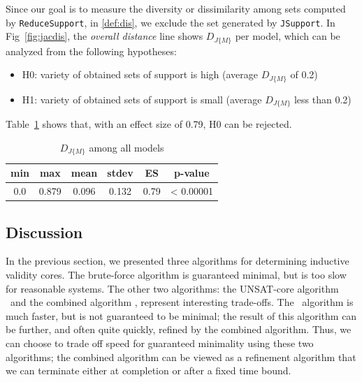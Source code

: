 Since our goal is to measure the diversity or dissimilarity among sets computed by \texttt{ReduceSupport}, in \ref{def:dis}, we exclude the set generated by \texttt{JSupport}. In Fig~\ref{fig:jacdis}, the \emph{overall distance} line shows $D_{J\{M\}}$ per model, which can be analyzed from the following hypotheses:
\begin{itemize}
  \item H0: variety of obtained sets of support is high (average $D_{J\{M\}}$ of 0.2)
  \item H1: variety of obtained sets of support is small (average $D_{J\{M\}}$ less than 0.2)
\end{itemize}
Table~\ref{tab:variety} shows that, with an effect size of 0.79, H0 can be rejected.
\begin{table}
  \centering
  \begin{tabular}{ |c|c|c|c|c|c| }
    \hline
     min & max & mean & stdev & ES & p-value\\[0.5ex]
    \hline
     0.0   & 0.879 & 0.096 & 0.132 & 0.79 & < 0.00001 \\[0.5ex]
    \hline
  \end{tabular}
  \caption{$D_{J\{M\}}$ among all models}
  \label{tab:variety}
\end{table}
\fi 


\subsection{Discussion}

In the previous section, we presented three algorithms for determining inductive validity cores.  The brute-force algorithm is guaranteed minimal, but is too slow for reasonable systems.  The other two algorithms: the UNSAT-core algorithm \ucalg\ and the combined algorithm \ucbfalg, represent interesting trade-offs.  The \ucalg\ algorithm is much faster, but is not guaranteed to be minimal; the result of this algorithm can be further, and often quite quickly, refined by the combined algorithm.  Thus, we can choose to trade off speed for guaranteed minimality using these two algorithms; the combined algorithm can be viewed as a refinement algorithm that we can terminate either at completion or after a fixed time bound.

